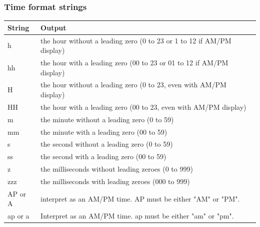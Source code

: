 \begin{frame}
  \frametitle{Time format strings}
  \scriptsize
  \begin{center}
  \begin{tabular}{|p{}|p{}|}
    \hline
    \textbf{String} & \textbf{Output} \\
    \hline
    h & the hour without a leading zero (0 to 23 or 1 to 12 if AM/PM display) \\
    \hline
    hh & the hour with a leading zero (00 to 23 or 01 to 12 if AM/PM display) \\
    \hline
    H & the hour without a leading zero (0 to 23, even with AM/PM display) \\
    \hline
    HH & the hour with a leading zero (00 to 23, even with AM/PM display) \\
    \hline
    m & the minute without a leading zero (0 to 59) \\
    \hline
    mm & the minute with a leading zero (00 to 59) \\
    \hline
    s & the second without a leading zero (0 to 59) \\
    \hline
    ss & the second with a leading zero (00 to 59) \\
    \hline
    z & the milliseconds without leading zeroes (0 to 999) \\
    \hline
    zzz & the milliseconds with leading zeroes (000 to 999) \\
    \hline
    AP or A & interpret as an AM/PM time. AP must be either "AM" or "PM". \\
    \hline
    ap or a & Interpret as an AM/PM time. ap must be either "am" or "pm". \\
    \hline
  \end{tabular}
  \end{center}
\end{frame}


